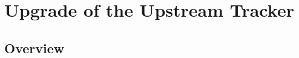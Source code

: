 \chapter{Upgrade of the Upstream Tracker}
\label{ref:ut}


\section{Overview}
\label{ref:ut:overview}
